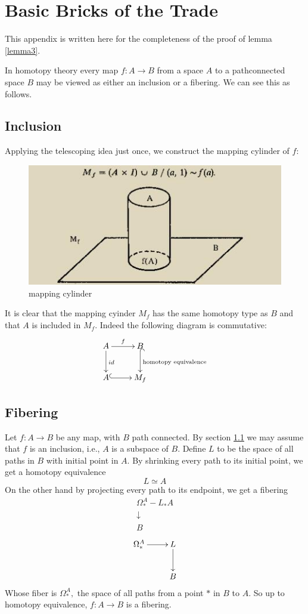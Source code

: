 \appendix
\section{Basic Bricks of the Trade}
This appendix is written here for the completeness of the proof of lemma \ref{lemma3}.
\par
In homotopy theory every map $f: A \rightarrow B$ from a space $A$ to a pathconnected space $B$ may be viewed as either an inclusion or a fibering. We can see this as follows.
\subsection{Inclusion} 
\label{inc}
Applying the telescoping idea just once, we construct the mapping cylinder of $f$:

\begin{figure}[h!]
\centering
\includegraphics[scale=1]{mappingcylinder.jpg}
\caption{mapping cylinder}
\label{UN}
\end{figure}
It is clear that the mapping cyinder $M_{f}$ has the same homotopy type as $B$ and that $A$ is included in $M_{f}$. Indeed the following diagram is commutative:
$$
\xymatrix{
A \ar[d]^{id} \ar[r]^f &B\ar@{^{(}->}[d]^{\text{homotopy equivalence}}\\
A\ar@{^{(}->}[r] & M_f}
$$
\subsection{Fibering}
Let $f: A \rightarrow B$ be any map, with $B$ path connected. By section \ref{inc} we may assume that $f$ is an inclusion, i.e., $A$ is a subspace of $B$. Define
$L$ to be the space of all paths in $B$ with initial point in $A$. By shrinking every path to its initial point, we get a homotopy equivalence
\[
L \simeq A
\]
On the other hand by projecting every path to its endpoint, we get a fibering
\[
\begin{array}{c}
\Omega_{*}^{A}-L_{*} A \\
\downarrow_{ } \\
B
\end{array}
\]
$$\xymatrix{
\Omega_{*}^{A}\ar[r]& L \ar[d]\\
&B
}$$
Whose fiber is $\Omega_{*}^{A},$ the space of all paths from a point $*$ in $B$ to $A .$ So up to homotopy equivalence, $f: A \rightarrow B$ is a fibering.